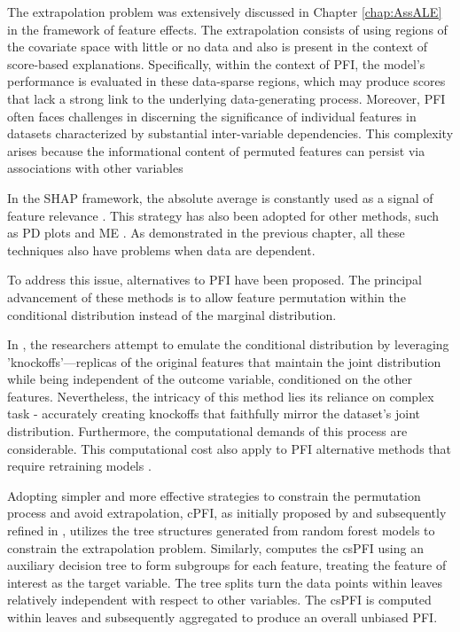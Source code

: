 The extrapolation problem was extensively discussed in Chapter \ref{chap:AssALE} in the framework of feature effects. The extrapolation consists of using regions of the covariate space with little or no data and also is present in the context of score-based explanations. Specifically, within the context of \gls{PFI}, the model's performance is evaluated in these data-sparse regions, which may produce scores that lack a strong link to the underlying data-generating process. Moreover, \gls{PFI} often faces challenges in discerning the significance of individual features in datasets characterized by substantial inter-variable dependencies. This complexity arises because the informational content of permuted features can persist via associations with other variables \cite{Strobl2008ConditionalForests, Hooker2019UnrestrictedImportance}

In the \gls{SHAP} framework, the absolute average is constantly used as a signal of feature relevance \cite{Scavuzzo2022FeatureSHAP}. This strategy has also been adopted for other methods, such as \gls{PD} plots \cite{Greenwell2018AMeasure} and \gls{ME}
\cite{Long2021UsingOutcomes}. As demonstrated in the previous chapter, all these techniques also have problems when data are dependent.

To address this issue, alternatives to \gls{PFI} have been proposed. The principal advancement of these methods is to allow feature permutation within the conditional distribution instead of the marginal distribution.

In \cite{Candes2018PanningSelection, Watson2021TestingAlgorithms}, the researchers attempt to emulate the conditional distribution by leveraging 'knockoffs'—replicas of the original features that maintain the joint distribution while being independent of the outcome variable, conditioned on the other features. Nevertheless, the intricacy of this method lies its reliance on complex task -  accurately creating knockoffs that faithfully mirror the dataset's joint distribution. Furthermore, the computational demands of this process are considerable. This computational cost also apply to \gls{PFI} alternative methods that require retraining models \cite{Hooker2019UnrestrictedImportance, Lei2018Distribution-FreeRegression, Gregorutti2017CorrelationForests}.

Adopting simpler and more effective strategies to constrain the permutation process and avoid extrapolation, \gls{cPFI}, as initially proposed by \cite{Strobl2008ConditionalForests} and subsequently refined in \cite{Debeer2020ConditionalRevisited}, utilizes the tree structures generated from random forest models to constrain the extrapolation problem. Similarly, \cite{Molnar2023Model-agnosticApproach} computes the \gls{csPFI} using an auxiliary decision tree to form subgroups for each feature, treating the feature of interest as the target variable. The tree splits turn the data points within leaves relatively independent with respect to other variables. The \gls{csPFI} is computed within leaves and subsequently aggregated to produce an overall unbiased \gls{PFI}.

